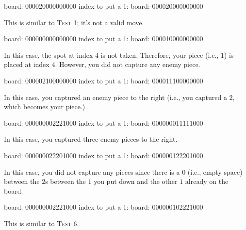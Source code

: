 \nextt
\begin{console}[frame=single, commandchars=\\\{\}]
board: 000020000000000
index to put a 1: 
board: 000020000000000
\end{console}
This is similar to \textsc{Test 1}; it's not a valid move.

\nextt
\begin{console}[frame=single, commandchars=\\\{\}]
board: 000000000000000
index to put a 1: 
board: 000010000000000
\end{console}
In this case, the spot at index $4$ is not taken. Therefore, your piece (i.e.,
$1$) is placed at index $4$. However, you did not capture any enemy piece.

\nextt
\begin{console}[frame=single, commandchars=\\\{\}]
board: 000002100000000
index to put a 1: 
board: 000011100000000
\end{console}
In this case, you captured an enemy piece to the right (i.e., you captured a
$2$, which becomes your piece.)

\nextt
\begin{console}[frame=single, commandchars=\\\{\}]
board: 000000002221000
index to put a 1: 
board: 000000011111000
\end{console}
In this case, you captured three enemy pieces to the right.

\nextt
\begin{console}[frame=single, commandchars=\\\{\}]
board: 000000022201000
index to put a 1: 
board: 000000122201000
\end{console}
In this case, you did not capture any pieces since there is a $0$ (i.e., empty
space) between the $2$s between the $1$ you put down and the other $1$ already
on the board.

\nextt
\begin{console}[frame=single, commandchars=\\\{\}]
board: 000000002221000
index to put a 1: 
board: 000000102221000
\end{console}
This is similar to \textsc{Test 6}.


